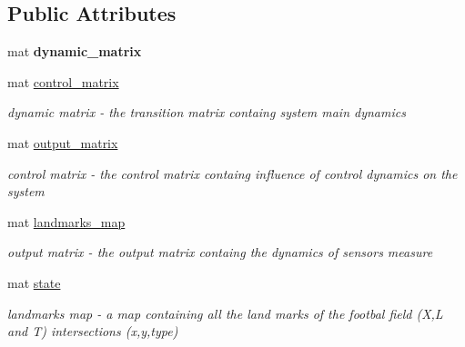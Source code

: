 \subsection*{Public Attributes}
\begin{DoxyCompactItemize}
\item 
\mbox{\label{class_robot_navigation_a1aad778b34e54f7fc85ec3ed744a444c}} 
mat {\bfseries dynamic\+\_\+matrix}
\item 
\mbox{\label{class_robot_navigation_a3cd228690cd188060ee65ca92c273be5}} 
mat \hyperlink{class_robot_navigation_a3cd228690cd188060ee65ca92c273be5}{control\+\_\+matrix}
\begin{DoxyCompactList}\small\item\em dynamic matrix -\/ the transition matrix containg system main dynamics \end{DoxyCompactList}\item 
\mbox{\label{class_robot_navigation_a30f84b9b191d662b8d6c5ba9ab4e665b}} 
mat \hyperlink{class_robot_navigation_a30f84b9b191d662b8d6c5ba9ab4e665b}{output\+\_\+matrix}
\begin{DoxyCompactList}\small\item\em control matrix -\/ the control matrix containg influence of control dynamics on the system \end{DoxyCompactList}\item 
\mbox{\label{class_robot_navigation_a1efd2001bd7cd70cc80d1c05b1c97988}} 
mat \hyperlink{class_robot_navigation_a1efd2001bd7cd70cc80d1c05b1c97988}{landmarks\+\_\+map}
\begin{DoxyCompactList}\small\item\em output matrix -\/ the output matrix containg the dynamics of sensors measure \end{DoxyCompactList}\item 
\mbox{\label{class_robot_navigation_a93eb7dd2877e1f72f5741fb396adea81}} 
mat \hyperlink{class_robot_navigation_a93eb7dd2877e1f72f5741fb396adea81}{state}
\begin{DoxyCompactList}\small\item\em landmarks map -\/ a map containing all the land marks of the footbal field (X,L and T) intersections (x,y,type) \end{DoxyCompactList}\item 

\end{DoxyCompactItemize}
